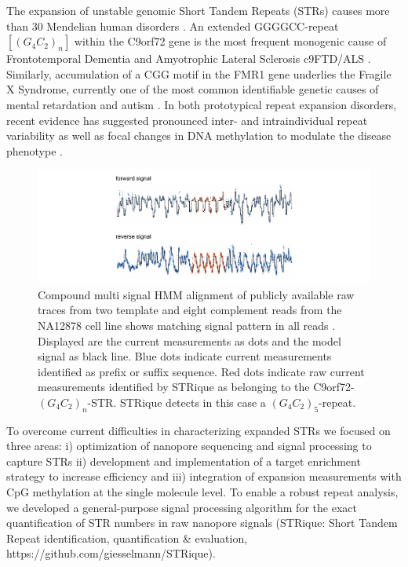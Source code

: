 The expansion of unstable genomic Short Tandem Repeats (STRs) causes more than 30 Mendelian human disorders \cite{Gatchel2005}. An extended GGGGCC-repeat $ [(G_{4}C_{2})_{n}] $ within the C9orf72 gene is the most frequent monogenic cause of Frontotemporal Dementia and Amyotrophic Lateral Sclerosis c9FTD/ALS \cite{Paulson2018}. Similarly, accumulation of a CGG motif in the FMR1 gene underlies the Fragile X Syndrome, currently one of the most common identifiable genetic causes of mental retardation and autism \cite{Verkerk1991}. In both prototypical repeat expansion disorders, recent evidence has suggested pronounced inter- and intraindividual repeat variability as well as focal changes in DNA methylation to modulate the disease phenotype \cite{Blitterswijk2013, Xi2013, Russ2015}.

\begin{figure}[h]
	\centering
	\includegraphics[width=1.0\textwidth]{figures/strique/signal.pdf}
	\captionsetup{format=plain}
	\caption[Nanopore raw signal of the C9orf72 STR in NA12878 cells]{Compound multi signal HMM alignment of publicly available raw traces from two template and eight complement reads from the NA12878 cell line shows matching signal pattern in all reads \cite{Jain2018}. Displayed are the current measurements as dots and the model signal as black line. Blue dots indicate current measurements identified as prefix or suffix sequence. Red dots indicate raw current measurements identified by STRique as belonging to the C9orf72-$ (G_{4}C_{2})_{n} $-STR. STRique detects in this case a $ (G_{4}C_{2})_{5} $-repeat.}
	\label{fig:strique:signal}
\end{figure}

To overcome current difficulties in characterizing expanded STRs we focused on three areas: i) optimization of nanopore sequencing and signal processing to capture STRs ii) development and implementation of a target enrichment strategy to increase efficiency and iii) integration of expansion measurements with CpG methylation at the single molecule level.
To enable a robust repeat analysis, we developed a general-purpose signal processing algorithm for the exact quantification of STR numbers in raw nanopore signals (STRique: Short Tandem Repeat identification, quantification \& evaluation, https://github.com/giesselmann/STRique).





